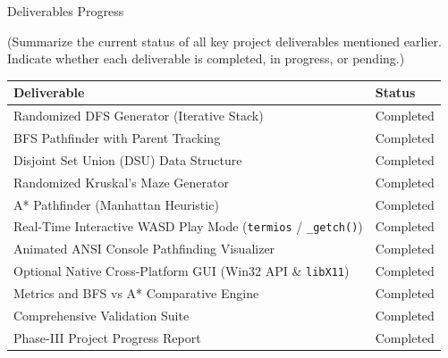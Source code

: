 \documentclass[12pt,a4paper]{article}
\renewcommand{\arraystretch}{1}
\newcommand{\secthead}[2]{%
  {\fontsize{18}{21.9}\selectfont\color{geheading}#1\par}\vspace{1.6pt}%
  {\fontsize{10.5}{14.5}\selectfont\color{gehint}#2\par}%
  \vspace{\secgap}}
\newlength{\secgap}\setlength{\secgap}{5.7pt}
\begin{document}
\vspace{10pt}

\secthead{Deliverables Progress }{(Summarize the current status of all key project deliverables mentioned earlier. Indicate whether each deliverable is completed, in progress, or pending.)}

{\fontsize{10.2}{12.2}\selectfont
\renewcommand{\arraystretch}{1.03}
\begin{tabularx}{\textwidth}{
|>{\raggedright\arraybackslash}X
|>{\raggedright\arraybackslash}p{}|
}
\hline
\textbf{Deliverable} & \textbf{Status} \\
\hline
Randomized DFS Generator (Iterative Stack) & Completed \\
\hline
BFS Pathfinder with Parent Tracking & Completed \\
\hline
Disjoint Set Union (DSU) Data Structure & Completed \\
\hline
Randomized Kruskal's Maze Generator & Completed \\
\hline
A* Pathfinder (Manhattan Heuristic) & Completed \\
\hline
Real-Time Interactive WASD Play Mode (\texttt{termios} / \texttt{\_getch()}) & Completed \\
\hline
Animated ANSI Console Pathfinding Visualizer & Completed \\
\hline
Optional Native Cross-Platform GUI (Win32 API \& \texttt{libX11}) & Completed \\
\hline
Metrics and BFS vs A* Comparative Engine & Completed \\
\hline
Comprehensive Validation Suite & Completed \\
\hline
Phase-III Project Progress Report & Completed \\
\hline
\end{tabularx}
\renewcommand{\arraystretch}{1}
}
\end{document}
